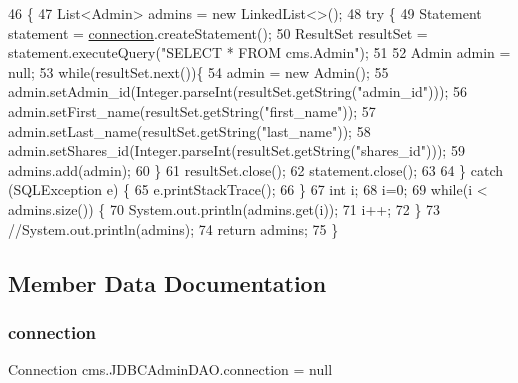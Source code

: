 \begin{DoxyCode}
46                                 \{
47         List<Admin> admins = \textcolor{keyword}{new} LinkedList<>();
48          \textcolor{keywordflow}{try} \{
49                 Statement statement = \mbox{\hyperlink{classcms_1_1_j_d_b_c_admin_d_a_o_a970f1be51071c85c0b1e55b45f21bcad}{connection}}.createStatement();
50                 ResultSet resultSet = statement.executeQuery(\textcolor{stringliteral}{"SELECT * FROM cms.Admin"});
51                  
52                 Admin admin = null;
53                 \textcolor{keywordflow}{while}(resultSet.next())\{
54                     admin = \textcolor{keyword}{new} Admin();
55                     admin.setAdmin\_id(Integer.parseInt(resultSet.getString(\textcolor{stringliteral}{"admin\_id"})));
56                     admin.setFirst\_name(resultSet.getString(\textcolor{stringliteral}{"first\_name"}));
57                     admin.setLast\_name(resultSet.getString(\textcolor{stringliteral}{"last\_name"}));
58                     admin.setShares\_id(Integer.parseInt(resultSet.getString(\textcolor{stringliteral}{"shares\_id"})));
59                     admins.add(admin);
60                 \}
61                 resultSet.close();
62                 statement.close();
63                  
64             \} \textcolor{keywordflow}{catch} (SQLException e) \{
65                 e.printStackTrace();
66             \}
67            \textcolor{keywordtype}{int} i;
68             i=0;
69             \textcolor{keywordflow}{while}(i < admins.size()) \{
70                     System.out.println(admins.get(i));
71                     i++;
72              \}
73             \textcolor{comment}{//System.out.println(admins);}
74             \textcolor{keywordflow}{return} admins;
75     \}
\end{DoxyCode}


\subsection{Member Data Documentation}
\mbox{\label{classcms_1_1_j_d_b_c_admin_d_a_o_a970f1be51071c85c0b1e55b45f21bcad}} 
\subsubsection{\texorpdfstring{connection}{connection}}
{\footnotesize\ttfamily Connection cms.\+J\+D\+B\+C\+Admin\+D\+A\+O.\+connection = null\hspace{0.3cm}{\ttfamily [package]}}


